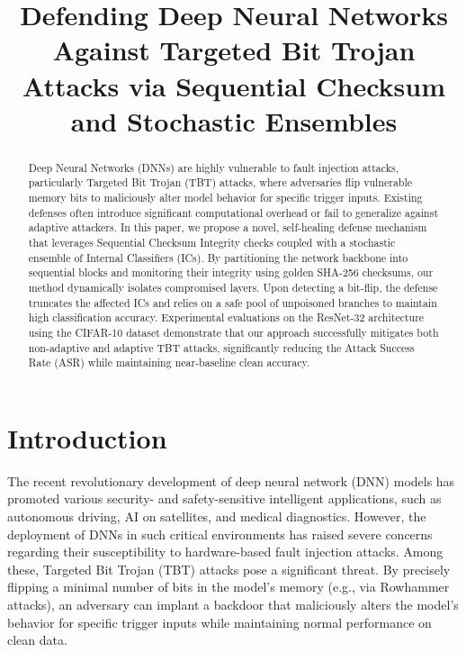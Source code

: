 \documentclass[conference]{IEEEtran}
\begin{document}
\title{Defending Deep Neural Networks Against Targeted Bit Trojan Attacks via Sequential Checksum and Stochastic Ensembles}

\author{
}

\maketitle

\begin{abstract}
Deep Neural Networks (DNNs) are highly vulnerable to fault injection attacks, particularly Targeted Bit Trojan (TBT) attacks, where adversaries flip vulnerable memory bits to maliciously alter model behavior for specific trigger inputs. Existing defenses often introduce significant computational overhead or fail to generalize against adaptive attackers. In this paper, we propose a novel, self-healing defense mechanism that leverages Sequential Checksum Integrity checks coupled with a stochastic ensemble of Internal Classifiers (ICs). By partitioning the network backbone into sequential blocks and monitoring their integrity using golden SHA-256 checksums, our method dynamically isolates compromised layers. Upon detecting a bit-flip, the defense truncates the affected ICs and relies on a safe pool of unpoisoned branches to maintain high classification accuracy. Experimental evaluations on the ResNet-32 architecture using the CIFAR-10 dataset demonstrate that our approach successfully mitigates both non-adaptive and adaptive TBT attacks, significantly reducing the Attack Success Rate (ASR) while maintaining near-baseline clean accuracy.
\end{abstract}

\section{Introduction}
The recent revolutionary development of deep neural network (DNN) models has promoted various security- and safety-sensitive intelligent applications, such as autonomous driving, AI on satellites, and medical diagnostics. However, the deployment of DNNs in such critical environments has raised severe concerns regarding their susceptibility to hardware-based fault injection attacks. Among these, Targeted Bit Trojan (TBT) attacks pose a significant threat. By precisely flipping a minimal number of bits in the model's memory (e.g., via Rowhammer attacks), an adversary can implant a backdoor that maliciously alters the model's behavior for specific trigger inputs while maintaining normal performance on clean data.
\end{document}

